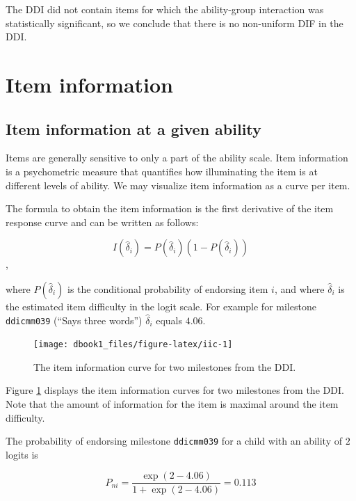 \documentclass[
]{book}
\begin{document}
The DDI did not contain items for which the ability-group interaction was statistically significant, so we conclude that there is no non-uniform DIF in the DDI.

\hypertarget{sec:iteminformation}{%
\section{Item information}\label{sec:iteminformation}}

\hypertarget{item-information-at-a-given-ability}{%
\subsection{Item information at a given ability}\label{item-information-at-a-given-ability}}

Items are generally sensitive to only a part of the ability scale. Item information is a psychometric measure that quantifies how illuminating the item is at different levels of ability. We may visualize item information as a curve per item.

The formula to obtain the item information is the first derivative of the item response curve and can be written as follows:

\[I(\hat\delta_i)=P(\hat\delta_i)(1-P(\hat\delta_i))\],

where \(P(\hat\delta_i)\) is the conditional probability of endorsing item \(i\), and where \(\hat\delta_i\) is the estimated item difficulty in the logit scale. For example for milestone \texttt{ddicmm039} (``Says three words'') \(\hat\delta_i\) equals \(4.06\).

\begin{figure}

{\centering \texttt{[image: dbook1\_files/figure-latex/iic-1]} 

}

\caption{The item information curve for two milestones from the DDI.}\label{fig:iic}
\end{figure}



Figure \ref{fig:iic} displays the item information curves for two milestones from the DDI. Note that the amount of information for the item is maximal around the item difficulty.

The probability of endorsing milestone \texttt{ddicmm039} for a child with an ability of \(2\) logits is

\[P_{ni}= \frac{\exp(2 - 4.06)}{1+\exp(2-4.06)} = 0.113\]
\end{document}
